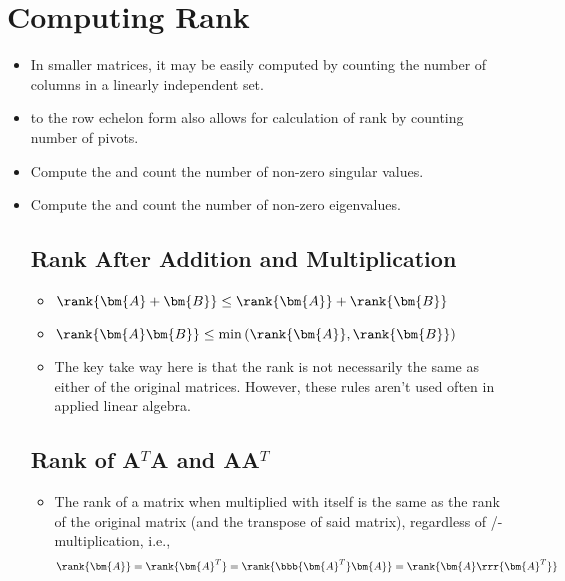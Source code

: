 \section{Computing Rank}\label{Computing Rank}
\begin{itemize}
  \item In smaller matrices, it may be easily computed by counting the number of columns in a linearly independent set.
  \item \hyperref[Row Echelon form]{} to the row echelon form also allows for calculation of rank by counting number of pivots.
  \item Compute the \hyperref[tbd]{} and count the number of non-zero singular values.
  \item Compute the \hyperref[tbd]{} and count the number of non-zero eigenvalues.
  
  \subsection{Rank After Addition and Multiplication}\label{Rank After Addition and Multiplication}
  \begin{itemize}
    \item \(\rank{\bm{A}+\bm{B}} \leq \rank{\bm{A}} + \rank{\bm{B}} \)
    \item \(\rank{\bm{A}\bm{B}} \leq \min{(\rank{\bm{A}},\rank{\bm{B}})} \)
    \item The key take way here is that the rank is not necessarily the same as either of the original matrices. However, these rules aren't used often in applied linear algebra.
  \end{itemize}
  
  \subsection{Rank of A\texorpdfstring{\(^T\)}{}A and AA\texorpdfstring{\(^T\)}{}}\label{Rank of ATA and AAT}
  \begin{itemize}
    \item The rank of a matrix when multiplied with itself is the same as the rank of the original matrix (and the transpose of said matrix), regardless of /-multiplication, i.e.,
    \[%
    \rank{\bm{A}}  = \rank{\bm{A}^T} = \rank{\bbb{\bm{A}^T}\bm{A}} = \rank{\bm{A}\rrr{\bm{A}^T}}
    \]%
    

\end{itemize}
\end{itemize}
